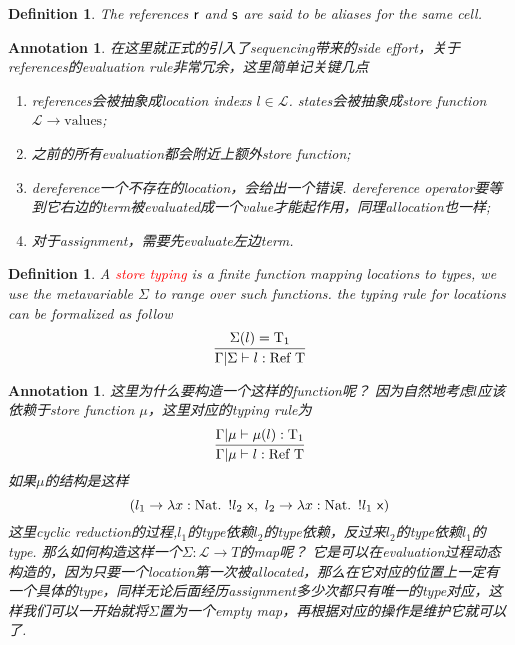 \documentclass{article}
\theoremstyle{plain}
\newtheorem{definition}[theorem]{Definition}
\newtheorem{annotation}[theorem]{Annotation}
\theoremstyle{nonumberplain}
\newcommand{\lam}[2]{\ensuremath{\lambda #1\ldotp~ #2}} %
\newcommand{\singletype}[1]{\text{#1}}
\newcommand{\termtype}[2]{\ensuremath{#1:#2}}
\newcommand{\term}[1]{\ensuremath\mathsf{#1}}
\newcommand{\redt}[1]{\textcolor{red}{#1}}
\begin{document}
\begin{definition}
\rm The  references $\term{r}$ and $\term{s}$ are said to be aliases for the same cell. 
\end{definition}

\begin{annotation}
\rm 在这里就正式的引入了sequencing带来的side effort，关于references的evaluation rule非常冗余，这里简单记关键几点
\begin{enumerate}
	\item references会被抽象成location indexs $l \in \mathcal{L}$. states会被抽象成store function $\mathcal{L} \to \text{values}$;
	\item 之前的所有evaluation都会附近上额外store function;
	\item dereference一个不存在的location，会给出一个错误. dereference operator要等到它右边的term被evaluated成一个value才能起作用，同理allocation也一样;
	\item 对于assignment，需要先evaluate左边term. 
\end{enumerate}
\end{annotation}

\begin{definition}
\rm A \redt{store typing} is a finite function mapping locations to types, we use the metavariable $\Sigma$ to range over such functions. the typing rule for locations can be formalized as follow
$$
\infer{\Gamma | \Sigma \vdash \termtype{l}{\singletype{Ref}~\singletype{T}}}{\Sigma({l})=\singletype{T}_1}
$$
\end{definition}

\begin{annotation}
\rm 这里为什么要构造一个这样的function呢？ 因为自然地考虑$l$应该依赖于store function $\mu$，这里对应的typing rule为
$$
\infer{\Gamma | \mu \vdash \termtype{l}{\singletype{Ref}~\singletype{T}}}{\Gamma | \mu \vdash \termtype{\mu({l})}{\singletype{T}_1}}
$$
如果$\mu$的结构是这样
$$
(l_1 \to \lam{\termtype{x}{\singletype{Nat}}}{!l_2~\term{x}},
~l_2 \to \lam{\termtype{x}{\singletype{Nat}}}{!l_1~\term{x}})
$$
这里cyclic reduction的过程,$l_1$的type依赖$l_2$的type依赖，反过来$l_2$的type依赖$l_1$的type. 那么如何构造这样一个$\Sigma\colon\mathcal{L} \to T$的map呢？ 它是可以在evaluation过程动态构造的，因为只要一个location第一次被allocated，那么在它对应的位置上一定有一个具体的type，同样无论后面经历assignment多少次都只有唯一的type对应，这样我们可以一开始就将$\Sigma$置为一个empty map，再根据对应的操作是维护它就可以了. 
\end{annotation}
\end{document}
